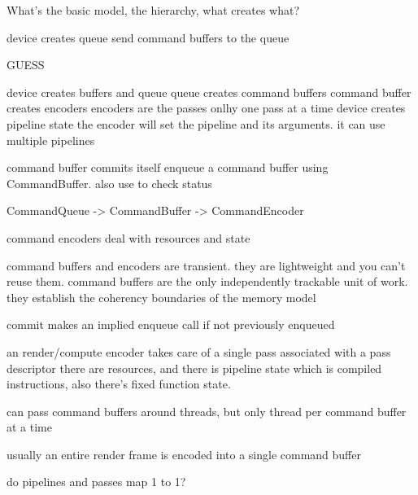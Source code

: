 
What's the basic model, the hierarchy, what creates what?

device creates queue
send command buffers to the queue

GUESS

device creates buffers and queue
queue creates command buffers
command buffer creates encoders
encoders are the passes
onlhy one pass at a time
device creates pipeline state
the encoder will set the pipeline and its arguments. 
it can use multiple pipelines


command buffer commits itself
enqueue a command buffer using CommandBuffer. also use to check status

CommandQueue -> CommandBuffer -> CommandEncoder

command encoders deal with resources and state

command buffers and encoders are transient. they are lightweight and you can't reuse them.
command buffers are the only independently trackable unit of work. they establish the coherency boundaries of the memory model

commit makes an implied enqueue call if not previously enqueued

an render/compute encoder takes care of a single pass
associated with a pass descriptor
there are resources, and there is pipeline state which is compiled instructions, also there's fixed function state.

can pass command buffers around threads, but only thread per command buffer at a time

usually an entire render frame is encoded into a single command buffer

do pipelines and passes map 1 to 1?



